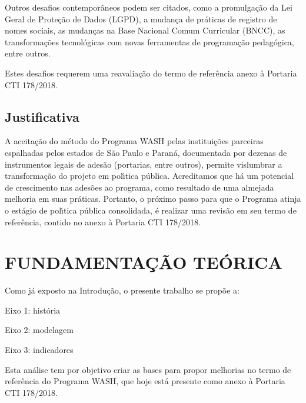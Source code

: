 \documentclass[
12pt,		%
openright,	%
twoside,  %
a4paper,			%
chapter=TITLE,		%
english,			%
french,				%
spanish,			%
brazil				%
]{USPSC-classe/USPSC}
\begin{document}
Outros desafios contempor\^aneos podem ser citados, como a promulga\c{c}\~ao da Lei Geral de Prote\c{c}\~ao de Dados (LGPD), a mudan\c{c}a de pr\'aticas de registro de nomes sociais, as mudan\c{c}as na Base Nacional Comum Curricular (BNCC), as transforma\c{c}\~oes tecnol\'ogicas com novas ferramentas de programa\c{c}\~ao pedag\'ogica, entre outros.




Estes desafios requerem uma reavalia\c{c}\~ao do termo de refer\^encia anexo \`a Portaria CTI 178/2018.




\section[Justificativa]{Justificativa}\label{Justificativa}
A aceita\c{c}\~ao do m\'etodo do Programa WASH pelas institui\c{c}\~oes parceiras espalhadas pelos estados de S\~ao Paulo e Paran\'a, documentada por dezenas de instrumentos legais de ades\~ao (portarias, entre outros), permite vislumbrar a transforma\c{c}\~ao do projeto em pol\'{\i}tica p\'ublica. Acreditamos que h\'a um potencial de crescimento nas ades\~oes ao programa, como resultado de uma almejada melhoria em suas pr\'aticas. Portanto, o pr\'oximo passo para que o Programa atinja o est\'agio de pol\'{\i}tica p\'ublica consolidada, \'e realizar uma revis\~ao em seu termo de refer\^encia, contido no anexo \`a Portaria CTI 178/2018.




\chapter[FUNDAMENTA\c{C}\~AO TE\'ORICA ]{FUNDAMENTA\c{C}\~AO TE\'ORICA }\label{FUNDAMENTA\c{C}\~AO TE\'ORICA }
Como j\'a exposto na \textquotedbl Introdu\c{c}\~ao\textquotedbl , o presente trabalho se prop\~oe a:





\begin{alineas}
\item Eixo 1: hist\'oria
\item Eixo 2: modelagem
\item Eixo 3: indicadores
\end{alineas}

Esta an\'alise tem por objetivo criar as bases para propor melhorias no termo de refer\^encia do Programa WASH, que hoje est\'a presente como anexo \`a Portaria CTI 178/2018.
\end{document}

